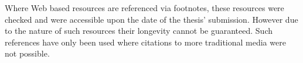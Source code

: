 Where Web based resources are referenced via footnotes, these resources were checked and were accessible upon the date of the thesis' submission. However due to the nature of such resources their longevity cannot be guaranteed. Such references have only been used where citations to more traditional media were not possible.